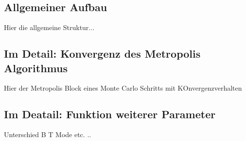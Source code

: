\subsection{Allgemeiner Aufbau}

Hier die allgemeine Struktur...

\subsection{Im Detail: Konvergenz des Metropolis Algorithmus}

Hier der Metropolis Block eines Monte Carlo Schritts mit KOnvergenzverhalten

\subsection{Im Deatail: Funktion weiterer Parameter}

Unterschied B T Mode etc. ..